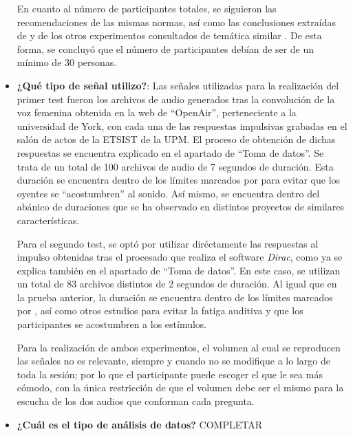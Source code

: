 \documentclass[11pt,a4paper,twoside]{book}
\begin{document}
\begin{itemize}
                    En cuanto al número de participantes totales, se siguieron las recomendaciones de las mismas normas, así como las conclusiones extraídas de \cite{Tejada2020} y de los otros experimentos consultados de temática similar \cite{2005IWitew, 2019DJSchlit, 2016SKlockgether, 2019LKritly, 2019GPulvirenti, 2019MNowak, 2011VEmiya}. De esta forma, se concluyó que el número de participantes debían de ser de un mínimo de 30 personas.
                    \item \textbf{¿Qué tipo de señal utilizo?}: Las señales utilizadas para la realización del primer test fueron los archivos de audio generados tras la convolución de la voz femenina obtenida en la web de ``OpenAir'', perteneciente a la universidad de York, con cada una de las respuestas impulsivas grabadas en el salón de actos de la ETSIST de la UPM. El proceso de obtención de dichas respuestas se encuentra explicado en el apartado de ``Toma de datos''. Se trata de un total de 100 archivos de audio de 7 segundos de duración. Esta duración se encuentra dentro de los límites marcados por \cite{UIT1116, UIT1534, UIT1284, EBU3286, UIT1285, UIT1286} para evitar que los oyentes se ``acostumbren'' al  sonido. Así mismo, se encuentra dentro del abánico de duraciones que se ha observado en distintos proyectos de similares características. \newline
                
                    Para el segundo test, se optó por utilizar diréctamente las respuestas al impulso obtenidas tras el procesado que realiza el software \textit{Dirac}, como ya se explica también en el apartado de ``Toma de datos''. En este caso, se utilizan un total de 83 archivos distintos de 2 segundos de duración. Al igual que en la prueba anterior, la duración se encuentra dentro de los límites marcados por \cite{UIT1116, UIT1534, UIT1284, EBU3286, UIT1285, UIT1286}, así como otros estudios para evitar la fatiga auditiva y que los participantes se acostumbren a los estímulos.
                
                    Para la realización de ambos experimentos, el volumen al cual se reproducen las señales no es relevante, siempre y cuando no se modifique a lo largo de toda la sesión; por lo que el participante puede escoger el que le sea más cómodo, con la única restricción de que el volumen debe ser el mismo para la escucha de los dos audios que conforman cada pregunta.
                    \item \textbf{¿Cuál es el tipo de análisis de datos?} COMPLETAR
                \end{itemize}
\end{document}
